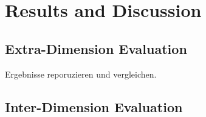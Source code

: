 \section{Results and Discussion}
\subsection{Extra-Dimension Evaluation}
Ergebnisse reporuzieren und vergleichen.
\subsection{Inter-Dimension Evaluation}

